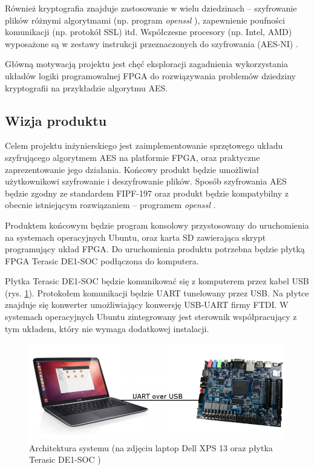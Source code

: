 Również kryptografia znajduje zastosowanie w wielu dziedzinach -- szyfrowanie plików różnymi algorytmami (np. program \textit{openssl} \cite{openssl}), zapewnienie poufności komunikacji (np. protokół SSL) itd. Współczesne procesory (np. Intel, AMD) wyposażone są w zestawy instrukcji przeznaczonych do szyfrowania (AES-NI) \cite{aes-processors}. 

Główną motywacją projektu jest chęć eksploracji zagadnienia wykorzystania układów logiki programowalnej FPGA do rozwiązywania problemów dziedziny kryptografii na przykładzie algorytmu AES.

\subsection{Wizja produktu}
Celem projektu inżynierskiego jest zaimplementowanie sprzętowego układu szyfrującego algorytmem AES na platformie FPGA, oraz praktyczne zaprezentowanie jego działania. Końcowy produkt będzie umożliwiał użytkownikowi szyfrowanie i deszyfrowanie plików. Sposób szyfrowania AES będzie zgodny ze standardem FIPF-197 \cite{aes-standard} oraz produkt będzie kompatybilny z obecnie istniejącym rozwiązaniem -- programem \textit{openssl} \cite{openssl}.

Produktem końcowym będzie program konsolowy przystosowany do uruchomienia na systemach operacyjnych Ubuntu, oraz karta SD zawierająca skrypt programujący układ FPGA. Do uruchomienia produktu potrzebna będzie płytką FPGA Terasic DE1-SOC podłączona do komputera.

Płytka Terasic DE1-SOC będzie komunikować się z komputerem przez kabel USB (rys. \ref{fig:system-architecture-basic}). Protokołem komunikacji będzie UART tunelowany przez USB. Na płytce znajduje się konwerter umożliwiający konwersję USB-UART firmy FTDI. W systemach operacyjnych Ubuntu zintegrowany jest sterownik współpracujący z tym układem, który nie wymaga dodatkowej instalacji.

\begin{figure}[!h]
\centering
\includegraphics[width=6in]{pictures/system-architecture-basic.png}
\caption{Architektura systemu (na zdjęciu laptop Dell XPS 13 \cite{laptop} oraz płytka Terasic DE1-SOC \cite{plytka})}
\label{fig:system-architecture-basic}
\end{figure}

